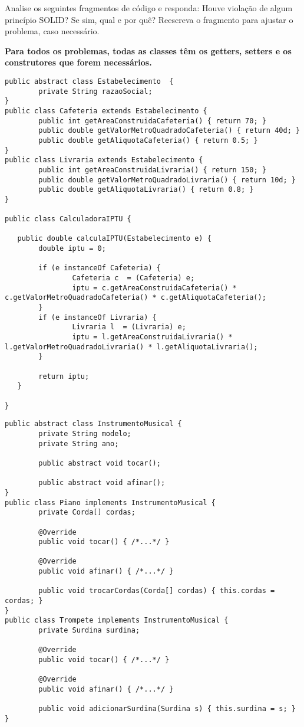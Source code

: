 \documentclass{lib/eng_softdoc}
\begin{document}
\makeheader

\problem Analise os seguintes fragmentos de código e responda: Houve violação de algum princípio SOLID? Se sim, qual e por quê? Reescreva o fragmento para ajustar o problema, caso necessário. 

\textbf{Para todos os problemas, todas as classes têm os getters, setters e os construtores que forem necessários.}

\subproblem
\begin{lstlisting}
public abstract class Estabelecimento  {
        private String razaoSocial;
}
public class Cafeteria extends Estabelecimento {
        public int getAreaConstruidaCafeteria() { return 70; }
        public double getValorMetroQuadradoCafeteria() { return 40d; }
        public double getAliquotaCafeteria() { return 0.5; }
}
public class Livraria extends Estabelecimento {
        public int getAreaConstruidaLivraria() { return 150; }
        public double getValorMetroQuadradoLivraria() { return 10d; }
        public double getAliquotaLivraria() { return 0.8; }
}

public class CalculadoraIPTU {

   public double calculaIPTU(Estabelecimento e) {
        double iptu = 0;

        if (e instanceOf Cafeteria) {
                Cafeteria c  = (Cafeteria) e;
                iptu = c.getAreaConstruidaCafeteria() * c.getValorMetroQuadradoCafeteria() * c.getAliquotaCafeteria();
        }
        if (e instanceOf Livraria) {
                Livraria l  = (Livraria) e;
                iptu = l.getAreaConstruidaLivraria() * l.getValorMetroQuadradoLivraria() * l.getAliquotaLivraria();
        }

        return iptu;
   }

}
\end{lstlisting}


\vspace{0.25cm}
\subproblem
\begin{lstlisting}
public abstract class InstrumentoMusical {
        private String modelo;
        private String ano;

        public abstract void tocar();

        public abstract void afinar();
}
public class Piano implements InstrumentoMusical {
        private Corda[] cordas;
        
        @Override
        public void tocar() { /*...*/ }
        
        @Override
        public void afinar() { /*...*/ }

        public void trocarCordas(Corda[] cordas) { this.cordas = cordas; }
}
public class Trompete implements InstrumentoMusical {
        private Surdina surdina;
        
        @Override
        public void tocar() { /*...*/ }
        
        @Override
        public void afinar() { /*...*/ }

        public void adicionarSurdina(Surdina s) { this.surdina = s; } 
}
\end{lstlisting}
\end{document}
